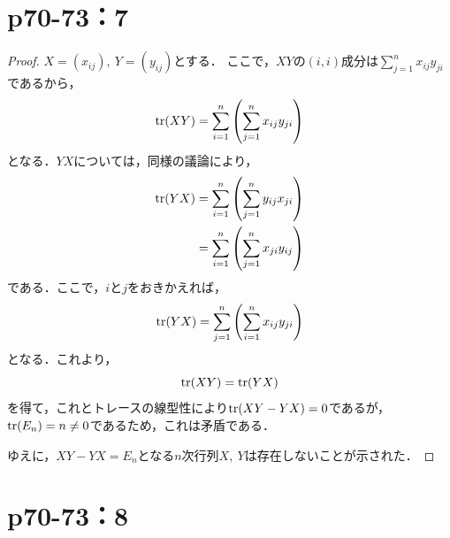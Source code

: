 \documentclass[a4paper,10pt,fleqn]{ltjsarticle}
\begin{document}
\newpage

\section*{p70-73：7}

\begin{tleftbar}
    \begin{proof}
        $X=(x_{ij}),~Y=(y_{ij})$とする．
        ここで，$XY$の$(i,i)$成分は$\sum_{j=1}^{n} x_{ij} y_{ji}$であるから，
        \begin{equation*}
            \tr (XY)  =  \sum_{i=1}^{n} \left( \sum_{j=1}^{n} x_{ij} y_{ji} \right)
        \end{equation*}
        となる．$YX$については，同様の議論により，
        \begin{align*}
            \tr  (YX) & =  \sum_{i=1}^{n}\left( \sum_{j=1}^{n}  y_{ij} x_{ji} \right)  \\
                      & =  \sum_{i=1}^{n} \left( \sum_{j=1}^{n}  x_{ji} y_{ij} \right)
        \end{align*}
        である．ここで，$i$と$j$をおきかえれば，
        \begin{equation}
            \tr  (YX) = \sum_{j=1}^{n} \left( \sum_{i=1}^{n}  x_{ij} y_{ji} \right)
        \end{equation}
        となる．これより，
        \begin{equation}
            \tr (XY) = \tr  (YX)
        \end{equation}
        を得て，これとトレースの線型性により$\tr (XY-YX) =0$であるが，$\tr  (E_n) =n \neq 0$であるため，これは矛盾である．

        ゆえに，$XY-YX=E_n$となる$n$次行列$X,~Y$は存在しないことが示された．
    \end{proof}
\end{tleftbar}

\newpage

\section*{p70-73：8}
\end{document}
